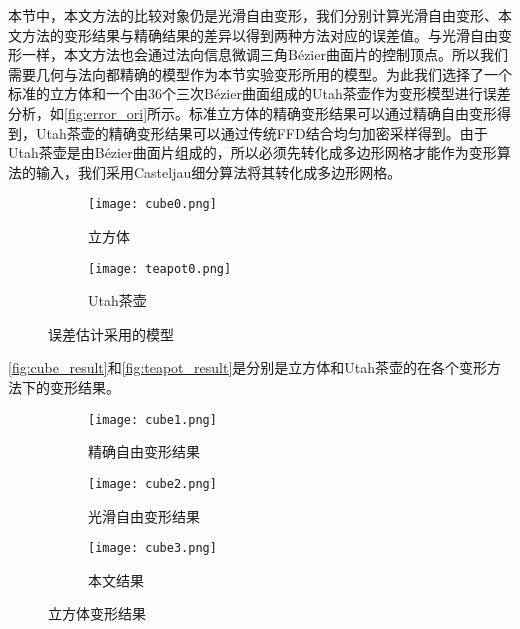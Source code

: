 本节中，本文方法的比较对象仍是光滑自由变形，我们分别计算光滑自由变形、本文方法的变形结果与精确结果的差异以得到两种方法对应的误差值。与光滑自由变形一样，本文方法也会通过法向信息微调三角Bézier曲面片的控制顶点。所以我们需要几何与法向都精确的模型作为本节实验变形所用的模型。为此我们选择了一个标准的立方体和一个由36个三次Bézier曲面组成的Utah茶壶作为变形模型进行误差分析，如\autoref{fig:error_ori}所示。标准立方体的精确变形结果可以通过精确自由变形\cite{Feng00}得到，Utah茶壶的精确变形结果可以通过传统FFD结合均匀加密采样得到。由于Utah茶壶是由Bézier曲面片组成的，所以必须先转化成多边形网格才能作为变形算法的输入，我们采用Casteljau细分算法\cite{farin2000essentials}将其转化成多边形网格。

\begin{figure}[htbp]
	\centering
	\begin{subfigure}[b]{.4\textwidth}
		\centering
		\texttt{[image: cube0.png]}
		\caption{立方体}\label{subfig:cube0}
	\end{subfigure}
	\quad
	\begin{subfigure}[b]{.4\textwidth}
		\centering
		\texttt{[image: teapot0.png]}
		\caption{Utah茶壶}\label{subfig:teapot0}
	\end{subfigure}
	\quad
	\caption{误差估计采用的模型}\label{fig:error_ori}
\end{figure}

\autoref{fig:cube_result}和\autoref{fig:teapot_result}是分别是立方体和Utah茶壶的在各个变形方法下的变形结果。

\begin{figure}[htbp]
	\centering
	\begin{subfigure}[b]{.3\textwidth}
		\centering
		\texttt{[image: cube1.png]}
		\caption{精确自由变形结果}\label{subfig:cube1}
	\end{subfigure}
	\begin{subfigure}[b]{.3\textwidth}
		\centering
		\texttt{[image: cube2.png]}
		\caption{光滑自由变形结果}\label{subfig:cube2}
	\end{subfigure}
	\begin{subfigure}[b]{.3\textwidth}
		\centering
		\texttt{[image: cube3.png]}
		\caption{本文结果}\label{subfig:cube3}
	\end{subfigure}
	\caption{立方体变形结果}\label{fig:cube_result}
\end{figure}

